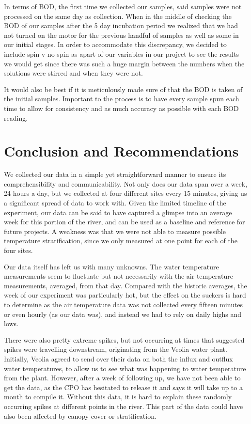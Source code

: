 \documentclass{article}\usepackage[]{graphicx}\usepackage[]{color}
\begin{document}
In terms of BOD, the first time we collected our samples, said samples were not processed on the same day as collection. When in the middle of checking the BOD of our samples after the 5 day incubation period we realized that we had not turned on the motor for the previous handful of samples as well as some in our initial stages. In order to accommodate this discrepancy, we decided to include spin v no spin as apart of our variables in our project to see the results we would get since there was such a huge margin between the numbers when the solutions were stirred and when they were not.

It would also be best if it is meticulously made sure of that the BOD is taken of the initial samples. Important to the process is to have every sample spun each time to allow for consistency and as much accuracy as possible with each BOD reading. 


\section{Conclusion and Recommendations}
We collected our data in a simple yet straightforward manner to ensure its comprehensibility and communicability. Not only does our data span over a week, 24 hours a day, but we collected at four different sites every 15 minutes, giving us a significant spread of data to work with. Given the limited timeline of the experiment, our data can be said to have captured a glimpse into an average week for this portion of the river, and can be used as a baseline and reference for future projects. A weakness was that we were not able to measure possible temperature stratification, since we only measured at one point for each of the four sites. 

Our data itself has left us with many unknowns. The water temperature measurements seem to fluctuate but not necessarily with the air temperature measurements, averaged, from that day. Compared with the historic averages, the week of our experiment was particularly hot, but the effect on the suckers is hard to determine as the air temperature data was not collected every fifteen minutes or even hourly (as our data was), and instead we had to rely on daily highs and lows. 

There were also pretty extreme spikes, but not occurring at times that suggested spikes were travelling downstream, originating from the Veolia water plant. Initially, Veolia agreed to send over their data on both the influx and outflux water temperatures, to allow us to see what was happening to water temperature from the plant. However, after a week of following up, we have not been able to get the data, as the CPO has hesitated to release it and says it will take up to a month to compile it. Without this data, it is hard to explain these randomly occurring spikes at different points in the river. This part of the data could have also been affected by canopy cover or stratification. 
\end{document}
